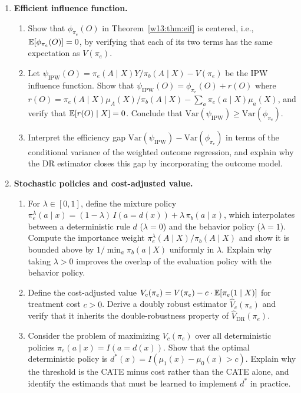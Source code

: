 \documentclass[master.tex]{subfiles}
\begin{document}
\begin{enumerate}
\item \textbf{Efficient influence function.}
\begin{enumerate}
  \item Show that $\phi_{\pi_e}(O)$ in Theorem~\ref{w13:thm:eif} is
    centered, i.e., $\mathbb{E}[\phi_{\pi_e}(O)]=0$, by verifying that each
    of its two terms has the same expectation as $V(\pi_e)$.
  \item Let $\psi_{\mathrm{IPW}}(O)=\pi_e(A\mid X)Y/\pi_b(A\mid X)-V(\pi_e)$
    be the IPW influence function.  Show that
    $\psi_{\mathrm{IPW}}(O)=\phi_{\pi_e}(O)+r(O)$ where
    $r(O)=\pi_e(A\mid X)\mu_A(X)/\pi_b(A\mid X)
    -\sum_a\pi_e(a\mid X)\mu_a(X)$, and verify that $\mathbb{E}[r(O)\mid X]=0$.
    Conclude that $\mathrm{Var}(\psi_{\mathrm{IPW}})\geq\mathrm{Var}(\phi_{\pi_e})$.
  \item Interpret the efficiency gap
    $\mathrm{Var}(\psi_{\mathrm{IPW}})-\mathrm{Var}(\phi_{\pi_e})$
    in terms of the conditional variance of the weighted outcome
    regression, and explain why the DR estimator closes this gap
    by incorporating the outcome model.
\end{enumerate}

\item \textbf{Stochastic policies and cost-adjusted value.}
\begin{enumerate}
  \item For $\lambda\in[0,1]$, define the mixture policy
    $\pi_e^\lambda(a\mid x)
    =(1-\lambda)\,I(a=d(x))+\lambda\,\pi_b(a\mid x)$,
    which interpolates between a deterministic rule $d$ ($\lambda=0$)
    and the behavior policy ($\lambda=1$).  Compute the importance
    weight $\pi_e^\lambda(A\mid X)/\pi_b(A\mid X)$ and show it is
    bounded above by $1/\min_a\pi_b(a\mid X)$ uniformly in $\lambda$.
    Explain why taking $\lambda>0$ improves the overlap of the
    evaluation policy with the behavior policy.
  \item Define the cost-adjusted value
    $V_c(\pi_e)=V(\pi_e)-c\cdot\mathbb{E}[\pi_e(1\mid X)]$ for treatment
    cost $c>0$.  Derive a doubly robust estimator $\hat V_c(\pi_e)$
    and verify that it inherits the double-robustness property of
    $\hat V_{\mathrm{DR}}(\pi_e)$.
  \item Consider the problem of maximizing $V_c(\pi_e)$ over all
    deterministic policies $\pi_e(a\mid x)=I(a=d(x))$.  Show that
    the optimal deterministic policy is $d^*(x)=I(\mu_1(x)-\mu_0(x)>c)$.
    Explain why the threshold is the CATE minus cost rather than the
    CATE alone, and identify the estimands that must be learned to
    implement $d^*$ in practice.
\end{enumerate}

\end{enumerate}

\ifSubfilesClassLoaded{%
  
  
}{}
\end{document}
